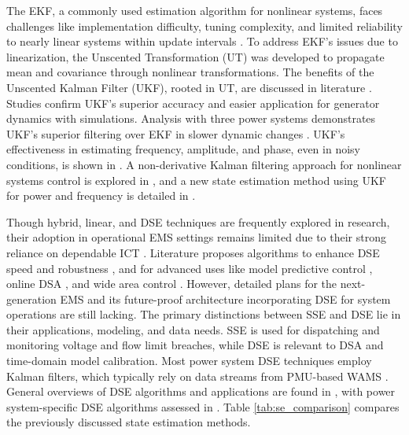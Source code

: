 The EKF, a commonly used estimation algorithm for nonlinear systems, faces challenges like implementation difficulty, tuning complexity, and limited reliability to nearly linear systems within update intervals \autocite{1271397}. To address EKF's issues due to linearization, the Unscented Transformation (UT) was developed to propagate mean and covariance through nonlinear transformations. The benefits of the Unscented Kalman Filter (UKF), rooted in UT, are discussed in literature \autocite{Valverde2011, 6019414, 6112697}. Studies \autocite{5619951, 6112697} confirm UKF's superior accuracy and easier application for generator dynamics with simulations. Analysis with three power systems demonstrates UKF's superior filtering over EKF in slower dynamic changes \autocite{Valverde2011}. UKF's effectiveness in estimating frequency, amplitude, and phase, even in noisy conditions, is shown in \autocite{6019414}. A non-derivative Kalman filtering approach for nonlinear systems control is explored in \autocite{5892889}, and a new state estimation method using UKF for power and frequency is detailed in \autocite{6142065}.

Though hybrid, linear, and DSE techniques are frequently explored in research, their adoption in operational EMS settings remains limited due to their strong reliance on dependable ICT \autocite{8624411}. Literature proposes algorithms to enhance DSE speed and robustness \autocite{7742899,WANG2020105390,8063917,7864445}, and for advanced uses like model predictive control \autocite{5342446, 6632979}, online DSA \autocite{SUN2016160, 6158623}, and wide area control \autocite{6202751}. However, detailed plans for the next-generation EMS and its future-proof architecture incorporating DSE for system operations are still lacking. The primary distinctions between SSE and DSE lie in their applications, modeling, and data needs. SSE is used for dispatching and monitoring voltage and flow limit breaches, while DSE is relevant to DSA and time-domain model calibration. Most power system DSE techniques employ Kalman filters, which typically rely on data streams from PMU-based WAMS \autocite{6802979,5871327,7501856,TEBIANIAN2015109}. General overviews of DSE algorithms and applications are found in \autocite{Simon_2006,Singh_Pal_2019}, with power system-specific DSE algorithms assessed in \autocite{6887334}. Table \ref{tab:se_comparison} compares the previously discussed state estimation methods.

